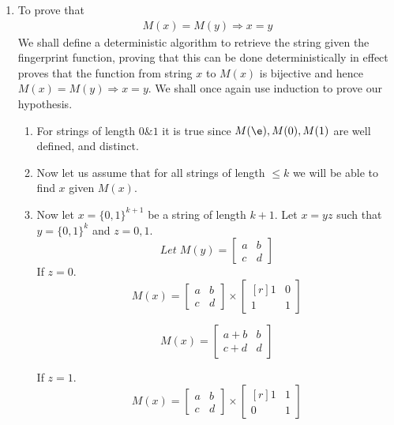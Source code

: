 \documentclass{assignment}
\begin{document}
\begin{problemlist}
\begin{problem}
\begin{answer}
\begin{enumerate}
\item To prove that 
\begin{eqnarray}
 M(x) = M(y) \Rightarrow x =y 
\end{eqnarray}
We shall define a deterministic algorithm to retrieve the string given the fingerprint function, proving that this can be done deterministically in effect proves that the function from string $x$ to $M(x)$ is bijective and hence  $M(x) = M(y) \Rightarrow x =y$. We shall once again use induction to prove our hypothesis.  
\begin{enumerate}
 \item For strings of length $0 \& 1$ it is true since $M(\e),M(0),M(1)$ are well defined, and distinct. 
 \item Now let us assume that for all strings of length $\leq k$ we will be able to find $x$ given $M(x)$. 
 \item Now let $x=\{0,1\}^{k+1}$ be a string of length $k+1$. Let $x=yz$ such that $y=\{0,1\}^k$ and $z={0,1}$. 
\begin{equation}
Let \; M(y) =                
 \begin{bmatrix}
  a & b \\
  c & d 
 \end{bmatrix}
\end{equation}
If $z=0$. 
\begin{equation}
M(x) = 
\begin{bmatrix}
  a & b \\
  c & d 
 \end{bmatrix}
\times
\begin{bmatrix*}[r]
 1 & 0 \\
 1 & 1 
\end{bmatrix*}
\end{equation}
 
\begin{equation}
M(x) = 
\begin{bmatrix}
 a+b & b \\
 c+d & d 
\end{bmatrix}
\end{equation}
 
If $z=1$. 
\begin{equation}
M(x) = 
\begin{bmatrix}
  a & b \\
  c & d 
 \end{bmatrix}
\times
\begin{bmatrix*}[r]
 1 & 1 \\
 0 & 1 
\end{bmatrix*}
\end{equation}
 

\end{enumerate}
\end{enumerate}
\end{answer}
\end{problem}
\end{problemlist}
\end{document}
